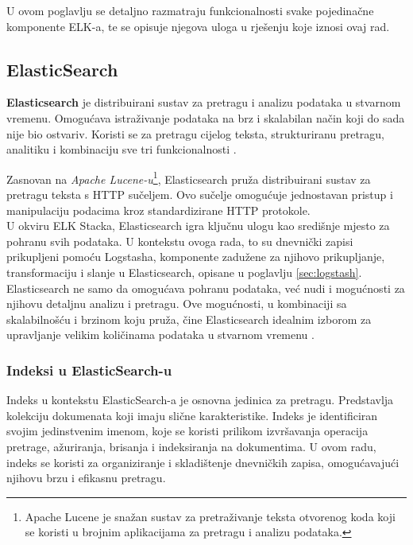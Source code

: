 \documentclass[times, utf8, diplomski]{fer}
\begin{document}
U ovom poglavlju se detaljno razmatraju funkcionalnosti svake pojedinačne komponente ELK-a, te se opisuje njegova uloga u rješenju koje iznosi ovaj rad.

\subsection{ElasticSearch}
\label{sec:elastic}

\textbf{Elasticsearch} je distribuirani sustav za pretragu i analizu podataka u stvarnom vremenu. Omogućava istraživanje podataka na brz i skalabilan način koji do sada nije bio ostvariv. Koristi se za pretragu cijelog teksta, strukturiranu pretragu, analitiku i kombinaciju sve tri funkcionalnosti \citep{gormley_elasticsearch_2015}.

Zasnovan na \emph{Apache Lucene-u}\footnote{Apache Lucene je snažan sustav za pretraživanje teksta otvorenog koda koji se koristi u brojnim aplikacijama za pretragu i analizu podataka.}, Elasticsearch pruža distribuirani sustav za pretragu teksta s HTTP sučeljem. Ovo sučelje omogućuje jednostavan pristup i manipulaciju podacima kroz standardizirane HTTP protokole. \\

U okviru ELK Stacka, Elasticsearch igra ključnu ulogu kao središnje mjesto za pohranu svih podataka. U kontekstu ovoga rada, to su dnevnički zapisi prikupljeni pomoću Logstasha, komponente zadužene za njihovo prikupljanje, transformaciju i slanje u Elasticsearch, opisane u poglavlju \ref{sec:logstash}.\\

Elasticsearch ne samo da omogućava pohranu podataka, već nudi i mogućnosti za njihovu detaljnu analizu i pretragu. Ove mogućnosti, u kombinaciji sa skalabilnošću i brzinom koju pruža, čine Elasticsearch idealnim izborom za upravljanje velikim količinama podataka u stvarnom vremenu .

\subsubsection{Indeksi u ElasticSearch-u}

Indeks u kontekstu ElasticSearch-a je osnovna jedinica za pretragu. Predstavlja kolekciju dokumenata koji imaju slične karakteristike. Indeks je identificiran svojim jedinstvenim imenom, koje se koristi prilikom izvršavanja operacija pretrage, ažuriranja, brisanja i indeksiranja na dokumentima. U ovom radu, indeks se koristi za organiziranje i skladištenje dnevničkih zapisa, omogućavajući njihovu brzu i efikasnu pretragu.
\end{document}

